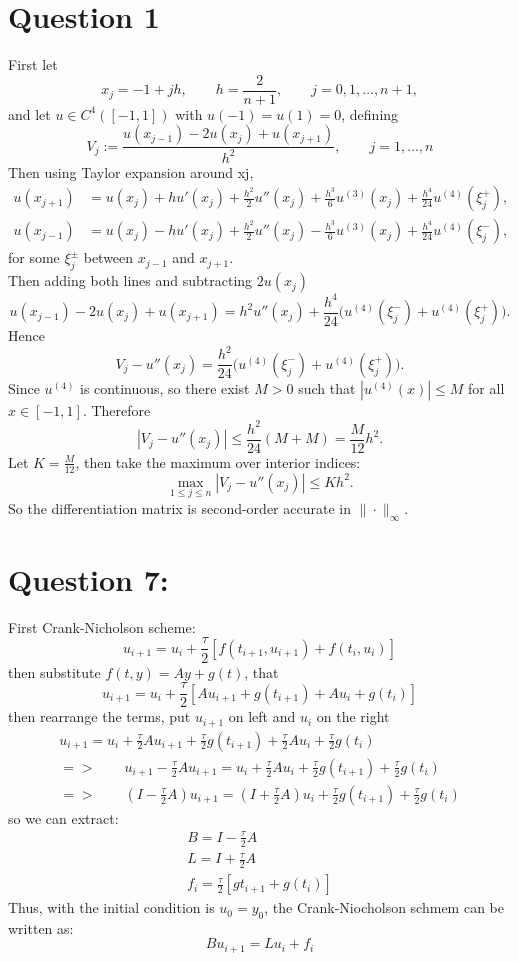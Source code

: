 \documentclass[11pt]{article}
\begin{document}
    \section*{Question 1}
    First let
    \[
        x_j=-1+jh,\qquad h=\frac{2}{n+1},\qquad j=0,1,\dots,n+1,
    \]
    and let $u\in C^4([-1,1])$ with $u(-1)=u(1)=0$, defining
    \[
        V_j:=\frac{u(x_{j-1})-2u(x_j)+u(x_{j+1})}{h^2}, \qquad j=1,\dots,n
    \]
    Then using Taylor expansion around xj,
    \begin{align*}
        u(x_{j+1}) &= u(x_j)+h u'(x_j)+\frac{h^2}{2}u''(x_j)+\frac{h^3}{6}u^{(3)}(x_j)+\frac{h^4}{24}u^{(4)}(\xi_j^+),\\
        u(x_{j-1}) &= u(x_j)-h u'(x_j)+\frac{h^2}{2}u''(x_j)-\frac{h^3}{6}u^{(3)}(x_j)+\frac{h^4}{24}u^{(4)}(\xi_j^-),
    \end{align*}
    for some $\xi_j^\pm$ between $x_{j-1}$ and $x_{j+1}$.\\
    Then adding both lines and subtracting $2u(x_j)$
    \[
        u(x_{j-1})-2u(x_j)+u(x_{j+1})=h^2u''(x_j)+\frac{h^4}{24}\big(u^{(4)}(\xi_j^-)+u^{(4)}(\xi_j^+)\big).
    \]
    Hence
    \[
        V_j-u''(x_j)=\frac{h^2}{24}\big(u^{(4)}(\xi_j^-)+u^{(4)}(\xi_j^+)\big).
    \]
    Since $u^{(4)}$ is continuous, so there exist $M>0$ such that
    $|u^{(4)}(x)|\le M$ for all $x\in[-1,1]$. Therefore
    \[
        |V_j-u''(x_j)|\le \frac{h^2}{24}(M+M)=\frac{M}{12}h^2.
    \]
    Let $K=\frac{M}{12}$, then take the maximum over interior indices:
    \[
        \max_{1\le j\le n}|V_j-u''(x_j)|\le Kh^2.
    \]
    So the differentiation matrix is second-order accurate in $\|\cdot\|_\infty$.

    \section*{Question 7:}
    First Crank-Nicholson scheme:
    \[
        u_{i+1} = u_i + \frac{\tau}{2}\left[f(t_{i+1}, u_{i+1}) + f(t_i, u_i)\right]
    \]
    then substitute $f(t,y) = Ay + g(t)$, that
    \[
        u_{i+1} = u_i + \frac{\tau}{2}\left[Au_{i+1} + g(t_{i+1}) + Au_i + g(t_i)\right]
    \]
    then rearrange the terms, put $u_{i+1}$ on left and $u_i$ on the right
    \begin{align*}
        u_{i+1} = u_i + \frac{\tau}{2}Au_{i+1} + \frac{\tau}{2}g(t_{i+1}) + \frac{\tau}{2}Au_i + \frac{\tau}{2}g(t_i) \\
        => \qquad u_{i+1} - \frac{\tau}{2}Au_{i+1} = u_i + \frac{\tau}{2}Au_i + \frac{\tau}{2}g(t_{i+1})  + \frac{\tau}{2}g(t_i) \\
        => \qquad (I-\frac{\tau}{2}A) u_{i+1} = (I+\frac{\tau}{2}A) u_i + \frac{\tau}{2}g(t_{i+1})  + \frac{\tau}{2}g(t_i)
    \end{align*}
    so we can extract:
    \begin{align}
        B = I - \frac{\tau}{2}A \\
        L = I + \frac{\tau}{2}A \\
        f_{i} = \frac{\tau}{2}[g{t_{i+1}} + g(t_{i})]
    \end{align}
    Thus, with the initial condition is $u_0 = y_0$, the Crank-Niocholson schmem can be written as:
    \[
        Bu_{i+1} = Lu_{i} + f_{i}
    \]
\end{document}
